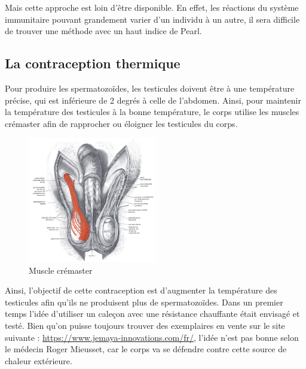 \documentclass[12pt,a4paper]{report}
\begin{document}
Mais cette approche est loin d'être disponible. En effet, les réactions du système immunitaire pouvant grandement varier d'un individu à un autre, il sera difficile de trouver une méthode avec un haut indice de Pearl. \cite{mclaughlinThereRoleImmunocontraception2011}

\subsection{La contraception thermique} \label{section:thermique}

Pour produire les spermatozoïdes, les testicules doivent être à une température précise, qui est inférieure de 2 degrés à celle de l'abdomen. \cite{Testicule2023}
Ainsi, pour maintenir la température des testicules à la bonne température, le corps utilise les muscles crémaster afin de rapprocher ou éloigner les testicules du corps. \cite{MuscleCremasterWikipedia}

\begin{figure}[h]
    \centering
    \includegraphics[width=0.5\textwidth]{images/scientiphique/Musculus_cremaster.png}
    \caption{Muscle crémaster}
    \label{fig:muscles-cremaster}
\end{figure}

Ainsi, l'objectif de cette contraception est d'augmenter la température des testicules afin qu'ils ne produisent plus de spermatozoïdes. \cite{wallachRoleTemperatureRegulation1988}
Dans un premier temps l'idée d'utiliser un caleçon avec une résistance chauffante était envisagé et testé. Bien qu'on puisse toujours trouver des exemplaires en vente sur le site suivante : \href{https://www.jemaya-innovations.com/fr/}{https://www.jemaya-innovations.com/fr/}, l'idée n'est pas bonne selon le médecin Roger Mieusset, car le corps va se défendre contre cette source de chaleur extérieure. \cite{guillaumedaudinContraceptesEnqueteDernier2022}
\end{document}
